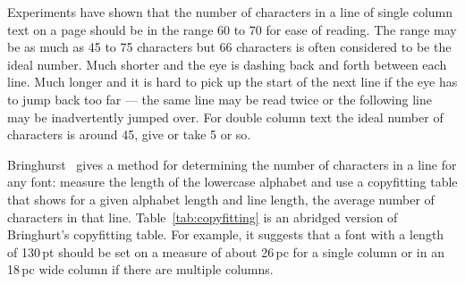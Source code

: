 \documentclass[10pt,letterpaper,extrafontsizes]{memoir}
\newcommand\U[2]{\textrm{#1}\,\textrm{#2}}
\begin{document}
    Experiments have shown that the number of characters in a line of
single column text on a page should be
in the range 60 to 70 for ease of reading. The range may be as much
as 45 to 75 characters but 66 characters is often
considered to be the ideal number. Much shorter and the eye is dashing
back and forth between each line. Much longer and it is hard to pick up the
start of the next line if the eye has to jump back too far --- the same line
may be read twice or the following line may be inadvertently jumped over.
For double column text the ideal number of characters 
is around 45, give or take 5 or so.

    Bringhurst~\autocite{BRINGHURST99} gives a 
method for determining the number
of characters in a line for any font: 
measure the length of the lowercase alphabet and use a 
copyfitting 
table that shows for a given alphabet 
length and line length, the average number of characters in that line.
 Table~\ref{tab:copyfitting} is an
abridged version of Bringhurt's copyfitting table.
For example, it suggests that a font with a length of \U{130}{pt} should be
set on a measure of about \U{26}{pc} for a single column 
or in an \U{18}{pc} wide column if there are multiple 
columns.
 
\end{document}
